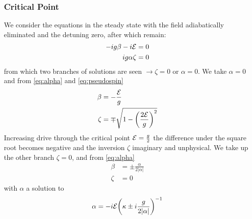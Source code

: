 \subsubsection{Critical Point}
We consider the equations in the steady state with the field adiabatically eliminated and the detuning zero, after which remain:
\begin{align}
  -ig \beta -i \mathcal{E} &= 0 \\
  ig\alpha \zeta &= 0
\end{align}
from which two branches of solutions are seen $\rightarrow \zeta = 0$ or $\alpha = 0$. We take $\alpha = 0$ and from \cref{eq:alpha} and \cref{eq:pseudospin}
\begin{align}
  \beta &= -\frac{\mathcal{E}}{g} \\
  \zeta &= \mp \sqrt{1 - {\left( \frac{2\mathcal{E}}{g} \right)}^2}
\end{align}
Increasing drive through the critical point $\mathcal{E} = \frac{g}{2}$ the difference under the square root becomes negative and the inversion $\zeta$ imaginary and unphysical. We take up the other branch $\zeta = 0$, and from \cref{eq:alpha}
\begin{align}
  \beta &= \pm \frac{\alpha}{2|\alpha|} \\
  \zeta &= 0
\end{align}
with $\alpha$ a solution to
\begin{equation}
  \alpha = -i \mathcal{E}{\left ( \kappa \pm i \frac{g}{2|\alpha|} \right )}^{-1}
  \label{eq:alphacondnotdet}
\end{equation}

